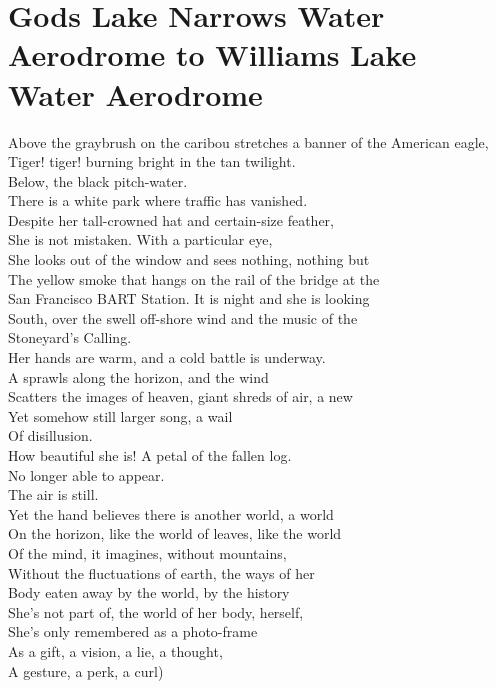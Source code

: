 \documentclass[smalldemyvopaper,11pt,twoside,onecolumn,openright,extrafontsizes]{memoir}
\begin{document}
\chapter{Gods Lake Narrows Water Aerodrome to Williams Lake Water Aerodrome}
Above the graybrush on the caribou stretches a banner of the American eagle,
\\Tiger! tiger! burning bright in the tan twilight.
\\Below, the black pitch-water.
\\There is a white park where traffic has vanished.
\\Despite her tall-crowned hat and certain-size feather,
\\She is not mistaken. With a particular eye,
\\She looks out of the window and sees nothing, nothing but
\\The yellow smoke that hangs on the rail of the bridge at the
\\San Francisco BART Station. It is night and she is looking
\\South, over the swell off-shore wind and the music of the
\\Stoneyard's Calling.
\\Her hands are warm, and a cold battle is underway.
\\A sprawls along the horizon, and the wind
\\Scatters the images of heaven, giant shreds of air, a new
\\Yet somehow still larger song, a wail
\\Of disillusion.
\\How beautiful she is! A petal of the fallen log.
\\No longer able to appear.
\\The air is still.
\\Yet the hand believes there is another world, a world
\\On the horizon, like the world of leaves, like the world
\\Of the mind, it imagines, without mountains,
\\Without the fluctuations of earth, the ways of her
\\Body eaten away by the world, by the history
\\She's not part of, the world of her body, herself,
\\She's only remembered as a photo-frame
\\As a gift, a vision, a lie, a thought,
\\A gesture, a perk, a curl)
\end{document}
